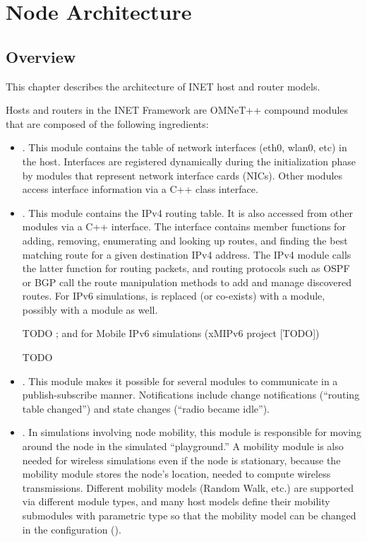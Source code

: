 \chapter{Node Architecture}
\label{cha:node-architecture}


\section{Overview}

This chapter describes the architecture of INET host and router models.

Hosts and routers in the INET Framework are OMNeT++ compound modules that
are composed of the following ingredients:

\begin{itemize}

\item {}. This module
contains the table of network interfaces (eth0, wlan0, etc) in the host.
Interfaces are registered dynamically during the initialization phase by
modules that represent network interface cards (NICs). Other modules access
interface information via a C++ class interface.

\item {}. This module contains
the IPv4 routing table. It is also accessed from other modules via a C++ interface.
The interface contains member functions for adding, removing, enumerating
and looking up routes, and finding the best matching route for a given
destination IPv4 address. The IPv4 module calls the latter function for
routing packets, and routing protocols such as OSPF or BGP call the route
manipulation methods to add and manage discovered routes. For IPv6
simulations,  is replaced (or co-exists) with
a  module, possibly with a 
module as well.

\ifdraft TODO
; and for Mobile IPv6 simulations (xMIPv6 project [TODO])
\fi

\ifdraft TODO
\item {}. This module
makes it possible for several modules to communicate in a publish-subscribe
manner. Notifications include change notifications (``routing table
changed'') and state changes (``radio became idle'').
\fi

\item {}. In simulations involving node mobility, this
module is responsible for moving around the node in the simulated
``playground.'' A mobility module is also needed for wireless simulations
even if the node is stationary, because the mobility module stores the
node's location, needed to compute wireless transmissions. Different
mobility models (Random Walk, etc.) are supported via different module
types, and many host models define their mobility submodules with
parametric type so that the mobility model can be changed in the
configuration ().


\end{itemize}
